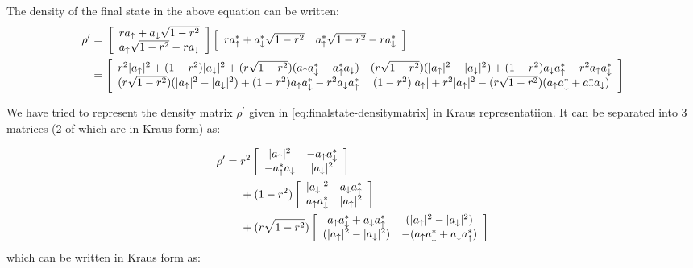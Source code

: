 \documentclass[english]{article}
\DeclarePairedDelimiter\abs{\lvert}{\rvert}
\begin{document}
The density of the final state in the above equation can be written:
\begin{equation}\label{eq:finalstate-densitymatrix}
\begin{aligned}
\rho^{\prime} & = {} \left[\begin{array}{c}ra_{\uparrow} + a_{\downarrow}\sqrt{1 - r^{2}} \\ a_{\uparrow}\sqrt{1 - r^{2}} - ra_{\downarrow} \end{array}\right] \left[\begin{array}{cc}ra_{\uparrow}^{*} + a_{\downarrow}^{*}\sqrt{1 - r^{2}} & a_{\uparrow}^{*}\sqrt{1 - r^{2}} - ra_{\downarrow}^{*} \end{array}\right] \\
& = \left[\begin{array}{cc} r^{2}\abs{a_{\uparrow}}^2+(1-r^{2})\abs{a_{\downarrow}}^{2}+(r\sqrt{1-r^{2}})(a_{\uparrow}a_{\downarrow}^{*}+a_{\uparrow}^{*}a_{\downarrow}) & (r\sqrt{1-r^{2}})(\abs{a_{\uparrow}}^{2} - \abs{a_{\downarrow}}^{2})+(1-r^{2})a_{\downarrow}a_{\uparrow}^{*}-r^{2}a_{\uparrow}a_{\downarrow}^{*} \\
(r\sqrt{1-r^{2}})(\abs{a_{\uparrow}}^{2} - \abs{a_{\downarrow}}^{2})+(1-r^{2})a_{\uparrow}a_{\downarrow}^{*}-r^{2}a_{\downarrow}a_{\uparrow}^{*} & (1-r^{2})\abs{a_{\uparrow}}+ r^{2}\abs{a_{\uparrow}}^2-(r\sqrt{1-r^{2}})(a_{\uparrow}a_{\downarrow}^{*}+a_{\uparrow}^{*}a_{\downarrow})
  \end{array}\right]
\end{aligned}
\end{equation}

We have tried to represent the density matrix $\rho^{\prime}$ given in \eqref{eq:finalstate-densitymatrix} in Kraus representatiion. It can be separated into 3 matrices (2 of which are in Kraus form) as:

\begin{equation}
  \begin{aligned}
  \rho^{\prime} = {} & r^{2} \left[\begin{array}{cc}\abs{a_{\uparrow}}^{2} & -a_{\uparrow}a_{\downarrow}^{*} \\
               -a_{\uparrow}^{*}a_{\downarrow} & \abs{a_{\downarrow}}^{2} \end{array} \right] \\
  & + (1-r^{2})\left[\begin{array}{cc}\abs{a_{\downarrow}}^{2} & a_{\downarrow}a_{\uparrow}^{*} \\
               a_{\uparrow}a_{\downarrow}^{*} & \abs{a_{\uparrow}}^{2} \end{array} \right] \\
  & + (r\sqrt{1-r^{2}})\left[\begin{array}{cc}a_{\uparrow}a_{\downarrow}^{*}+a_{\downarrow}a_{\uparrow}^{*} & (\abs{a_{\uparrow}}^{2}-\abs{a_{\downarrow}}^{2}) \\
             (\abs{a_{\uparrow}}^{2}-\abs{a_{\downarrow}}^{2}) & -(a_{\uparrow}a_{\downarrow}^{*}+a_{\downarrow}a_{\uparrow}^{*})\end{array} \right]
  \end{aligned}
\end{equation}
which can be written in Kraus form as:
\end{document}

